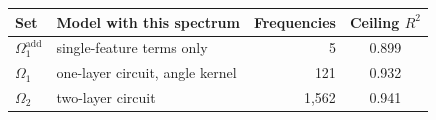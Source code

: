 \begin{tabular}{@{}llrc@{}}
\toprule
Set & Model with this spectrum & Frequencies & Ceiling $R^2$ \\
\midrule
$\Omega_1^{\mathrm{add}}$ & single-feature terms only & 5 & 0.899 \\
$\Omega_1$ & one-layer circuit, angle kernel & 121 & 0.932 \\
$\Omega_2$ & two-layer circuit & 1,562 & 0.941 \\
\bottomrule
\end{tabular}
